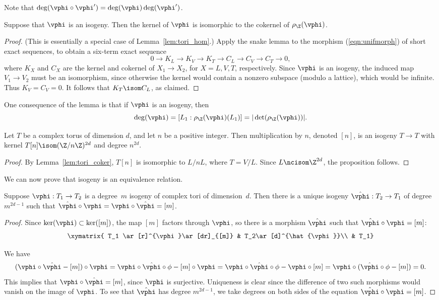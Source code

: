 \documentclass{report}
\begin{document}
Note that $\deg(\vphi\circ \vphi')=\deg(\vphi)\deg(\vphi')$.

\begin{lemma}\label{lem:tori_coker}
Suppose that $\vphi$ is an isogeny.  Then the kernel of $\vphi$ is
isomorphic to the cokernel of $\rho_\Z(\vphi)$.
\end{lemma}
\begin{proof}
(This is essentially a special case of Lemma~\ref{lem:tori_hom}.)
Apply the snake lemma to the morphism (\ref{eqn:unifmorph}) of
short exact sequences, to obtain a six-term exact sequence
\[
  0 \to K_L \to K_V \to K_T \to C_L \to C_V \to C_T \to 0,
\]
where $K_X$ and $C_X$ are the kernel and cokernel of $X_1\to X_2$,
for $X=L,V,T$, respectively.  Since $\vphi$ is an isogeny, the
induced map $V_1\to V_2$ must be an isomorphism, since otherwise
the kernel would contain a nonzero subspace (modulo a lattice),
which would be infinite.  Thus $K_V=C_V=0$.   It follows that
$K_T\isom C_L$, as claimed.
\end{proof}

One consequence of the lemma is that if $\vphi$ is an isogeny,
then
$$\deg(\vphi)=[L_1:\rho_{\Z}(\vphi)(L_1)]=|\det(\rho_\Z(\vphi))|.$$

\begin{proposition}
Let $T$ be a complex torus of dimension $d$, and let $n$ be a
positive integer. Then multiplication by $n$, denoted $[n]$, is an
isogeny $T\to T$ with kernel $T[n]\isom (\Z/n\Z)^{2d}$ and degree
$n^{2d}$.
\end{proposition}
\begin{proof}
By Lemma~\ref{lem:tori_coker}, $T[n]$ is isomorphic to $L/n L$,
where $T=V/L$.   Since $L\ncisom \Z^{2d}$, the proposition
follows.
\end{proof}

We can now prove that isogeny is an equivalence relation.
\begin{proposition}
Suppose $\vphi:T_1\to T_2$ is a degree~$m$ isogeny of complex tori
of dimension~$d$.  Then there is a unique isogeny
$\hat{\vphi}:T_2\to T_1$ of degree $m^{2d-1}$ such that
$\hat{\vphi}\circ \vphi = \vphi\circ \hat{\vphi} = [m]$.
\end{proposition}
\begin{proof}
Since $\ker(\vphi)\subset \ker([m])$, the map $[m]$ factors
through $\vphi$, so there is a morphism $\hat{\vphi}$ such that
$\hat{\vphi}\circ \vphi = [m]$:
\[
\xymatrix{
 T_1 \ar[r]^{\vphi}\ar[dr]_{[m]} & T_2\ar[d]^{\hat{\vphi}}\\
    & T_1}
\]

We have
\[
(\vphi\circ \hat{\vphi} - [m])\circ \vphi
 =\vphi\circ\hat{\vphi}\circ\phi - [m]\circ\vphi
 =\vphi\circ\hat{\vphi}\circ\phi - \vphi\circ[m]
 =\vphi\circ(\hat{\vphi}\circ\phi - [m]) = 0.
\]
This implies that $\vphi\circ \hat{\vphi} =[m]$, since $\vphi$ is
surjective.  Uniqueness is clear since the difference of two such
morphisms would vanish on the image of $\vphi$. To see that
$\hat{\vphi}$ has degree $m^{2d-1}$, we take degrees on both sides
of the equation $\hat{\vphi}\circ \vphi = [m]$.
\end{proof}
\end{document}
